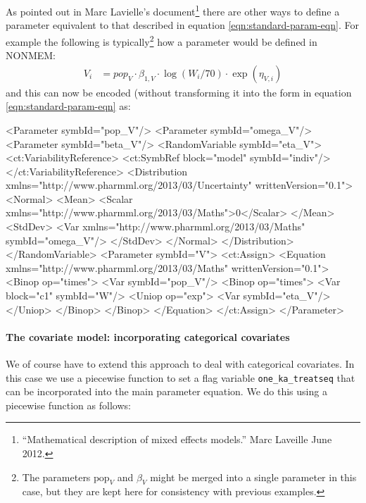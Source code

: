 \documentclass[a4paper,11pt]{article}
\begin{document}
As pointed out in Marc Lavielle's document\footnote{``Mathematical
  description of mixed effects models.'' Marc Laveille June 2012.}
there are other ways to define a parameter equivalent to that
described in equation \ref{eqn:standard-param-eqn}. For example the
following is typically\footnote{The parameters $\mathrm{pop}_V$ and
  $\beta_V$ might be merged into a single parameter in this case, but
  they are kept here for consistency with previous examples.} how a
parameter would be defined in NONMEM:
%
\begin{align*}
V_i &= pop_{V} \cdot \beta_{1,V} \cdot \log(W_i/70) \cdot
\exp\left(\eta_{V,i} \right)
\end{align*}
%
and this can now be encoded (without transforming it into the form in
equation \ref{eqn:standard-param-eqn} as:
%
\begin{xmlcode}
<Parameter symbId="pop_V"/>
<Parameter symbId="omega_V"/>
<Parameter symbId="beta_V"/>
<RandomVariable symbId="eta_V">
    <ct:VariabilityReference>
        <ct:SymbRef block="model" symbId="indiv"/>
    </ct:VariabilityReference>
    <Distribution xmlns="http://www.pharmml.org/2013/03/Uncertainty" writtenVersion="0.1">
        <Normal>
            <Mean>
                <Scalar
                xmlns="http://www.pharmml.org/2013/03/Maths">0</Scalar>
            </Mean>
            <StdDev>
                <Var xmlns="http://www.pharmml.org/2013/03/Maths"
                symbId="omega_V"/>
            </StdDev>
        </Normal>
    </Distribution>
</RandomVariable>
<Parameter symbId="V">
    <ct:Assign>
        <Equation xmlns="http://www.pharmml.org/2013/03/Maths" writtenVersion="0.1">
            <Binop op="times">
                <Var symbId="pop_V"/>
                <Binop op="times">
                    <Var block="c1" symbId="W"/>
                    <Uniop op="exp">
                        <Var symbId="eta_V"/>
                    </Uniop>
                </Binop>
            </Binop>
        </Equation>
    </ct:Assign>
</Parameter>
\end{xmlcode}


\paragraph{The covariate model: incorporating categorical covariates}

We of course have to extend this approach to deal with categorical
covariates. In this case we use a piecewise function to set a flag
variable \texttt{one\_ka\_treatseq} that can be incorporated into the main
parameter equation. We do this using a piecewise function as follows:
\end{document}
